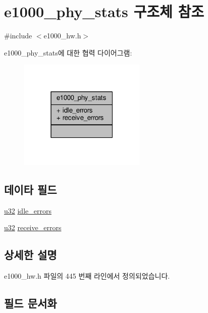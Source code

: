 \hypertarget{structe1000__phy__stats}{}\section{e1000\+\_\+phy\+\_\+stats 구조체 참조}
\label{structe1000__phy__stats}


{\ttfamily \#include $<$e1000\+\_\+hw.\+h$>$}



e1000\+\_\+phy\+\_\+stats에 대한 협력 다이어그램\+:
\nopagebreak
\begin{figure}[H]
\begin{center}
\leavevmode
\includegraphics[width=171pt]{structe1000__phy__stats__coll__graph}
\end{center}
\end{figure}
\subsection*{데이타 필드}
\begin{DoxyCompactItemize}
\item 
\hyperlink{lib_2igb_2e1000__osdep_8h_a64e91c10a0d8fb627e92932050284264}{u32} \hyperlink{structe1000__phy__stats_ad887e85e6e554233f79d12cccd018a15}{idle\+\_\+errors}
\item 
\hyperlink{lib_2igb_2e1000__osdep_8h_a64e91c10a0d8fb627e92932050284264}{u32} \hyperlink{structe1000__phy__stats_a49303efd179dc55f9da8da9baad13de2}{receive\+\_\+errors}
\end{DoxyCompactItemize}


\subsection{상세한 설명}


e1000\+\_\+hw.\+h 파일의 445 번째 라인에서 정의되었습니다.



\subsection{필드 문서화}
